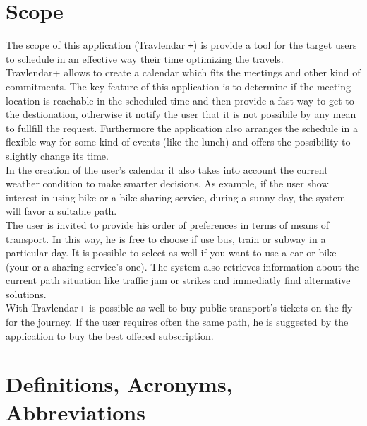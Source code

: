 \documentclass[numbers=noenddot, 12pt, a4paper, oneside]{scrbook}
\def\Plus{\texttt{+}}
\begin{document}
\section{Scope}

The scope of this application (Travlendar \Plus) is provide a tool for the target users to schedule in an effective way their time optimizing the travels.\\

Travlendar+ allows to create a calendar which fits the meetings and other kind of commitments.
The key feature of this application is to determine if the meeting location is reachable in the scheduled time and then provide a fast way to get to the destionation, otherwise it notify the user that it is not possibile by any mean to fullfill the request. Furthermore the application also arranges the schedule in a flexible way for some kind of events (like the lunch) and offers the possibility to slightly change its time.\\

In the creation of the user's calendar it also takes into account the current weather condition to make smarter decisions. As example, if the user show interest in using bike or a bike sharing service, during a sunny day, the system will favor a suitable path.\\

The user is invited to provide his order of preferences in terms of means of transport. In this way, he is free to choose if use bus, train or subway in a particular day. It is possible to select as well if you want to use a car or bike (your or a sharing service's one). The system also retrieves information about the current path situation like traffic jam or strikes and immediatly find alternative solutions.\\

With Travlendar+ is possible as well to buy public transport's tickets on the fly for the journey. If the user requires often the same path, he is suggested by the application to buy the best offered subscription.


\section{Definitions, Acronyms, Abbreviations}
\end{document}
